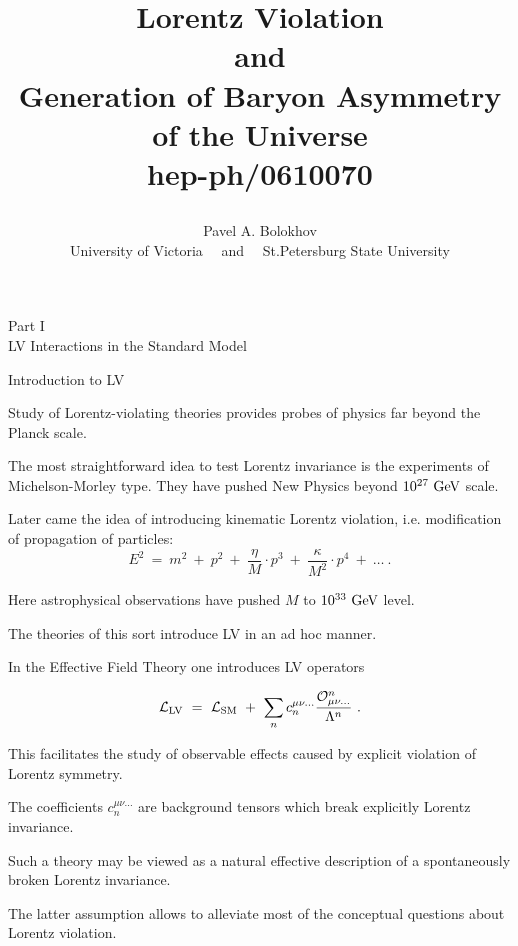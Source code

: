 \documentclass[pdf,UofT06talk,slideColor,colorBG,accumulate]{prosper}
\title{
\vspace{-1.0cm}
\begin{center}
\end{center}
\Large\lbrown Lorentz Violation \\ 
			and \\
	Generation of Baryon Asymmetry \\
		of the Universe\\
\normalsize hep-ph/0610070
}
\author{
\vspace{1.4cm}
\brown Pavel A. Bolokhov\\
University of Victoria~~ and ~~St.Petersburg State University
}
\newcommand{\mc}[1]{\mathcal{#1}}
\newcommand{\GeV}{{\rm GeV}}
\begin{document}
\maketitle

\begin{slide}{}

	\vspace{1.0cm}
\fontsize{30.0pt}{30.0pt}\selectfont
\begin{center}
	Part I\\
	LV Interactions in the Standard Model
\end{center}

\end{slide}


\begin{slide}[Glitter]{Introduction to LV}

	Study of Lorentz-violating theories provides probes of physics
	{\mybf far} beyond the Planck scale.
	
	The most straightforward idea to test Lorentz invariance is the
	experiments of Michelson-Morley type. 
	They have pushed New Physics beyond $ 10^{27}~\GeV $ scale. 

	Later came the idea of introducing {\myit kinematic} Lorentz violation,
	i.e. modification of propagation of particles:
{
\mathcolor
\[
	E^2 ~=~ m^2 ~+~ p^2 ~+~ \frac{\eta}{M} \cdot p^3 ~+~ 
			\frac{\kappa} {M^2} \cdot p^4 ~+~ \dots ~.
\]
}
	
	Here astrophysical observations have pushed  $ M $ to 
	$ 10^{33}~\GeV $ level.

	The theories of this sort introduce LV in an {\myit ad hoc} manner.

\end{slide}


\begin{slide}{}

	In the {\mybf Effective Field Theory} one introduces LV operators

{
\mathcolor
\begin{equation*}
	\mc{L}_{\rm LV} ~=~ \mc{L}_{\rm SM} 
				~+~
			\sum_n 
			c_n^{\mu\nu ...}
			\frac {\mc{O}_{\mu\nu ...}^n} {\Lambda^n}~.
\end{equation*}
}

	This facilitates the study of observable effects caused by explicit
	violation of Lorentz symmetry.

	The coefficients $ c_n^{\mu\nu ...} $ are background tensors which
	break explicitly Lorentz invariance.

	Such a theory may be viewed as a natural effective description of a 
	{\myit spontaneously} broken Lorentz invariance.

	The latter assumption allows to alleviate most of the conceptual questions
	about Lorentz violation.

\end{slide}
\end{document}

